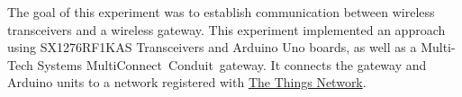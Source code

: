 The goal of this experiment was to establish communication between wireless transceivers and a wireless gateway.
This experiment implemented an approach using SX1276RF1KAS Transceivers and Arduino Uno boards, as well as a Multi-Tech Systems MultiConnect\textregistered\ Conduit\texttrademark\ gateway.
It connects the gateway and Arduino units to a network registered with \href{https://www.thethingsnetwork.org/}{The Things Network}.
